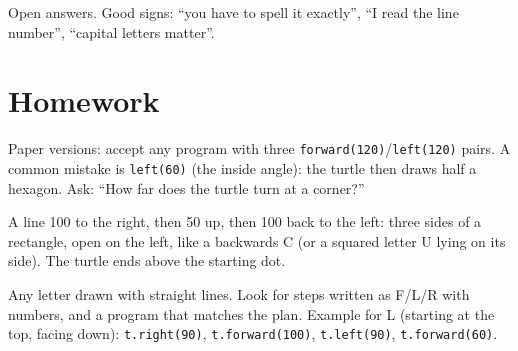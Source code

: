 \begin{answer}[Reflection]
Open answers. Good signs: \enquote{you have to spell it exactly}, \enquote{I read the line number}, \enquote{capital letters matter}.
\end{answer}

\section{Homework}
\begin{answer}
Paper versions: accept any program with three \texttt{forward(120)}/\texttt{left(120)} pairs. A common mistake is \texttt{left(60)} (the inside angle): the turtle then draws half a hexagon. Ask: \enquote{How far does the turtle turn at a corner?}
\end{answer}

\begin{answer}
A line 100 to the right, then 50 up, then 100 back to the left: three sides of a rectangle, open on the left, like a backwards C (or a squared letter U lying on its side). The turtle ends above the starting dot.
\end{answer}

\begin{answer}
Any letter drawn with straight lines. Look for steps written as F/L/R with numbers, and a program that matches the plan. Example for L (starting at the top, facing down): \texttt{t.right(90)}, \texttt{t.forward(100)}, \texttt{t.left(90)}, \texttt{t.forward(60)}.
\end{answer}
